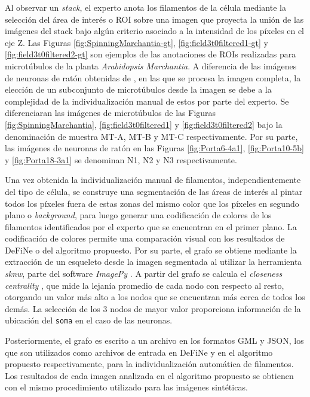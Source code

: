 Al observar un {\it stack}, el experto anota los filamentos de la c\'elula mediante la selecci\'on del \'area de inter\'es o ROI sobre una imagen que proyecta la uni\'on de las im\'agenes del stack bajo alg\'un criterio asociado a la intensidad de los p\'ixeles en el eje Z. Las Figuras \ref{fig:SpinningMarchantia-gt}, \ref{fig:field3t0filtered1-gt} y \ref{fig:field3t0filtered2-gt} son ejemplos de las anotaciones de ROIs realizadas para microt\'ubulos de la planta {\it Arabidopsis Marchantia}. A diferencia de las im\'agenes de neuronas de rat\'on obtenidas de \citet{ampuero2019chronic}, en las que se procesa la imagen completa, la elecci\'on de un subconjunto de microt\'ubulos desde la imagen se debe a la complejidad de la individualizaci\'on manual de estos por parte del experto. Se diferenciaran las im\'agenes de microt\'ubulos de las Figuras \ref{fig:SpinningMarchantia}, \ref{fig:field3t0filtered1} y \ref{fig:field3t0filtered2} bajo la denominaci\'on de muestra MT-A, MT-B y MT-C respectivamente. Por su parte, las im\'agenes de neuronas de rat\'on en las Figuras \ref{fig:Porta6-4a1}, \ref{fig:Porta10-5b} y \ref{fig:Porta18-3a1}  se denominan N1, N2 y N3 respectivamente.

Una vez obtenida la individualizaci\'on manual de filamentos, independientemente del tipo de c\'elula, se construye una segmentaci\'on de las \'areas de inter\'es al pintar todos los p\'ixeles fuera de estas zonas del mismo color que los p\'ixeles en segundo plano o {\it background}, para luego  generar una codificaci\'on de colores de los filamentos identificados por el experto que se encuentran en el primer plano. La codificaci\'on de colores permite una comparaci\'on visual con los resultados de DeFiNe o del algoritmo propuesto. Por su parte, el grafo se obtiene mediante la extracci\'on de un esqueleto desde la imagen segmentada al utilizar la herramienta {\it sknw}, parte del software {\it ImagePy} . A partir del grafo se calcula el {\it closeness centrality} , que mide la lejan\'ia promedio de cada nodo con respecto al resto, otorgando un valor m\'as alto a los nodos que se encuentran m\'as cerca de todos los dem\'as. La selecci\'on de los 3 nodos de mayor valor proporciona informaci\'on de la ubicaci\'on del {\tt soma} en el caso de las neuronas.


Posteriormente, el grafo es escrito a un archivo en los formatos GML y JSON, los que son utilizados como archivos de entrada en DeFiNe y en el algoritmo propuesto respectivamente, para la individualizaci\'on autom\'atica de filamentos.
Los resultados de cada imagen analizada en el algoritmo propuesto se obtienen con el mismo procedimiento utilizado para las im\'agenes sint\'eticas.


